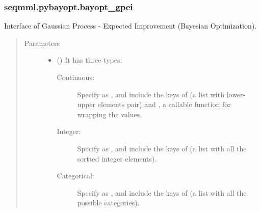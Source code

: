 \documentclass[letterpaper,10pt,english]{sphinxmanual}
\begin{document}
\subsubsection{seqmml.pybayopt.bayopt\_gpei}
\label{\detokenize{apidoc:module-pybayopt.bayopt_gpei}}\label{\detokenize{apidoc:seqmml-pybayopt-bayopt-gpei}}

\begin{fulllineitems}
\label{\detokenize{apidoc:pybayopt.bayopt_gpei.GPEIOPT}}
Interface of Gaussian Process - Expected Improvement (Bayesian Optimization).
\begin{quote}\begin{description}
\item[{Parameters}] \leavevmode\begin{itemize}
\item {} 
 () \textendash{} 
It has three types:
\begin{description}
\item[{Continuous: }] \leavevmode
Specify  as , and include the keys of  (a list with lower-upper elements pair) and
, a callable function for wrapping the values.

\item[{Integer:}] \leavevmode
Specify  as , and include the keys of  (a list with all the sortted integer elements).

\item[{Categorical:}] \leavevmode
Specify  as , and include the keys of  (a list with all the possible categories).

\end{description}



\end{itemize}
\end{description}
\end{quote}
\end{fulllineitems}
\end{document}
